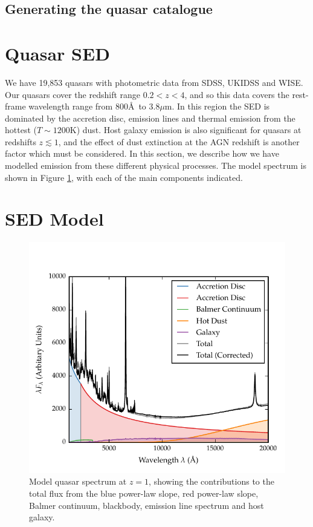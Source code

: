 
\subsection{Generating the quasar catalogue}

\section{Quasar \ac{SED}}

We have 19,853 quasars with photometric data from SDSS, UKIDSS and WISE. 
Our quasars cover the redshift range $0.2 < z < 4$, and so this data covers the rest-frame wavelength range from 800\AA\, to 3.8$\mu$m. 
In this region the \ac{SED} is dominated by the accretion disc, emission lines and thermal emission from the hottest ($T\sim1200$K) dust. 
Host galaxy emission is also significant for quasars at redshifts $z\lesssim1$, and the effect of dust extinction at the \ac{AGN} redshift is another factor which must be considered.   
In this section, we describe how we have modelled emission from these different physical processes. 
The model spectrum is shown in Figure \ref{fig:modelsed}, with each of the main components indicated. 

\section{SED Model}

\begin{figure}
  \centering
  \includegraphics[width=\textwidth]{figures/chapter05/sed_model.pdf}
  \caption{Model quasar spectrum at $z=1$, showing the contributions to the total flux from the blue power-law slope, red power-law slope, Balmer continuum, blackbody, emission line spectrum and host galaxy. }
  \label{fig:modelsed}
\end{figure}


